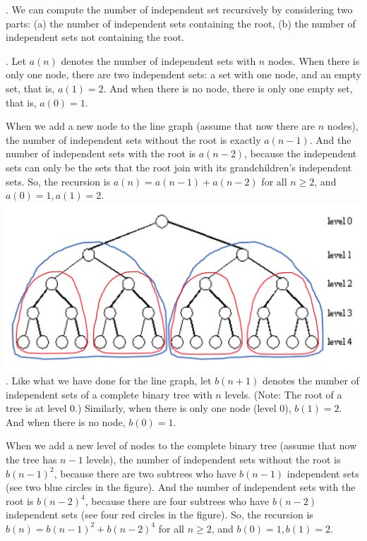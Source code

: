 \documentclass[11pt]{article} %
\begin{document}
. We can compute the number of independent set recursively by considering two parts: (a) the number of independent sets containing the root, (b) the number of independent sets not containing the root.

. Let $a(n)$ denotes the number of independent sets with $n$ nodes.
When there is only one node, there are two independent sets: a set with one node, and an empty set, that is, $a(1) = 2$. And when there is no node, there is only one empty set, that is, $a(0) =1$.
 
When we add a new node to the line graph (assume that now there are $n$ nodes), the number of independent sets without the root is exactly $a(n-1)$. And the number of independent sets with the root is $a(n-2)$, because the independent sets can only be the sets that the root join with its grandchildren's independent sets. So, the recursion is $a(n) = a(n-1) + a(n-2)$ for all $n \geq 2$, and $a(0)=1, a(1)=2$.\\

\includegraphics[scale=0.45]{figure.png}\\

. Like what we have done for the line graph, let $b(n+1)$ denotes the number of independent sets of a complete binary tree with $n$ levels. (Note: The root of a tree is at level 0.) Similarly, when there is only one node (level 0),  $b(1) = 2$. And when there is no node,  $b(0) =1$. 

When we add a new level of nodes to the complete binary tree (assume that now the tree has $n-1$ levels), the number of independent sets without the root is $b(n-1)^2$, because there are two subtrees who have  $b(n-1)$ independent sets (see two blue circles in the figure). And the number of independent sets with the root is $b(n-2)^4$, because there are four subtrees who have $b(n-2)$ independent sets (see four red circles in the figure). So, the recursion is $b(n) = b(n-1)^2 + b(n-2)^4$ for all $n \geq 2$, and $b(0)=1, b(1)=2$.
\end{document}
